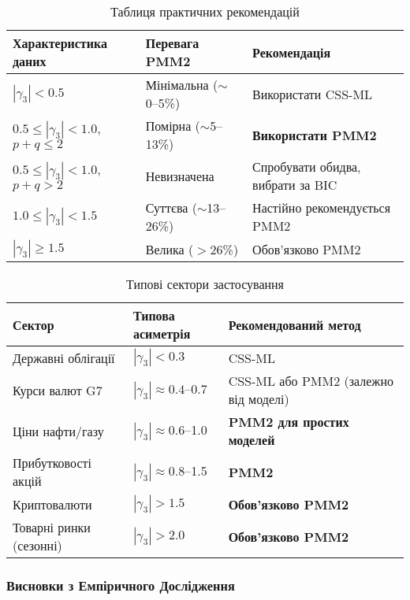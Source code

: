 \begin{table}[htbp]
\centering
\caption{Таблиця практичних рекомендацій}
\label{tab:wti_practical_recommendations}
\begin{tabular}{@{}lll@{}}
\toprule
\textbf{Характеристика даних} & \textbf{Перевага PMM2} & \textbf{Рекомендація} \\
\midrule
$|\gamma_3| < 0.5$ & Мінімальна ($\sim$0--5\%) & Використати CSS-ML \\
$0.5 \leq |\gamma_3| < 1.0$, $p+q \leq 2$ & Помірна ($\sim$5--13\%) & \textbf{Використати PMM2} \\
$0.5 \leq |\gamma_3| < 1.0$, $p+q > 2$ & Невизначена & Спробувати обидва, вибрати за BIC \\
$1.0 \leq |\gamma_3| < 1.5$ & Суттєва ($\sim$13--26\%) & Настійно рекомендується PMM2 \\
$|\gamma_3| \geq 1.5$ & Велика ($>$26\%) & Обов'язково PMM2 \\
\bottomrule
\end{tabular}
\end{table}

\begin{table}[htbp]
\centering
\caption{Типові сектори застосування}
\label{tab:wti_sector_recommendations}
\begin{tabular}{@{}lll@{}}
\toprule
\textbf{Сектор} & \textbf{Типова асиметрія} & \textbf{Рекомендований метод} \\
\midrule
Державні облігації & $|\gamma_3| < 0.3$ & CSS-ML \\
Курси валют G7 & $|\gamma_3| \approx 0.4$--0.7 & CSS-ML або PMM2 (залежно від моделі) \\
Ціни нафти/газу & $|\gamma_3| \approx 0.6$--1.0 & \textbf{PMM2 для простих моделей} \\
Прибутковості акцій & $|\gamma_3| \approx 0.8$--1.5 & \textbf{PMM2} \\
Криптовалюти & $|\gamma_3| > 1.5$ & \textbf{Обов'язково PMM2} \\
Товарні ринки (сезонні) & $|\gamma_3| > 2.0$ & \textbf{Обов'язково PMM2} \\
\bottomrule
\end{tabular}
\end{table}

\subsubsection{Висновки з Емпіричного Дослідження}
\label{subsubsec:wti_empirical_conclusions}

